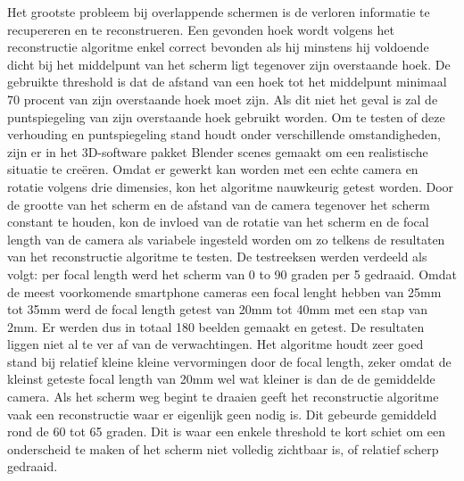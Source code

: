 Het grootste probleem bij overlappende schermen is de verloren informatie te recupereren en te reconstrueren. Een gevonden hoek wordt volgens het reconstructie algoritme enkel correct bevonden als hij minstens hij voldoende dicht bij het middelpunt van het scherm ligt tegenover zijn overstaande hoek. De gebruikte threshold is dat de afstand van een hoek tot het middelpunt minimaal 70 procent van zijn overstaande hoek moet zijn. Als dit niet het geval is zal de puntspiegeling van zijn overstaande hoek gebruikt worden.
Om te testen of deze verhouding en puntspiegeling stand houdt onder verschillende omstandigheden, zijn er in het 3D-software pakket Blender scenes gemaakt om een realistische situatie te creëren. Omdat er gewerkt kan worden met een echte camera en rotatie volgens drie dimensies, kon het algoritme nauwkeurig getest worden. Door de grootte van het scherm en de afstand van de camera tegenover het scherm constant te houden, kon de invloed van de rotatie van het scherm en de focal length van de camera als variabele ingesteld worden om zo telkens de resultaten van het reconstructie algoritme te testen. De testreeksen werden verdeeld als volgt: per focal length werd het scherm van 0 to 90 graden per 5 gedraaid. Omdat de meest voorkomende smartphone cameras een focal lenght hebben van 25mm tot 35mm werd de focal length getest van 20mm tot 40mm met een stap van 2mm. Er werden dus in totaal 180 beelden gemaakt en getest.
De resultaten liggen niet al te ver af van de verwachtingen. Het algoritme houdt zeer goed stand bij relatief kleine kleine vervormingen door de focal length, zeker omdat de kleinst geteste focal length van 20mm wel wat kleiner is dan de de gemiddelde camera. Als het scherm weg begint te draaien geeft het reconstructie algoritme vaak een reconstructie waar er eigenlijk geen nodig is. Dit gebeurde gemiddeld rond de 60 tot 65 graden. Dit is waar een enkele threshold te kort schiet om een onderscheid te maken of het scherm niet volledig zichtbaar is, of relatief scherp gedraaid.
